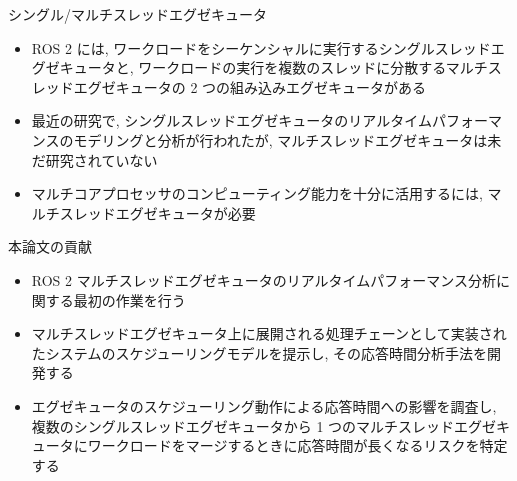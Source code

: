 \begin{frame}{シングル/マルチスレッドエグゼキュータ}
    \begin{itemize}
        \item ROS 2 には, ワークロードをシーケンシャルに実行するシングルスレッドエグゼキュータと, ワークロードの実行を複数のスレッドに分散するマルチスレッドエグゼキュータの 2 つの組み込みエグゼキュータがある
        \item 最近の研究で, シングルスレッドエグゼキュータのリアルタイムパフォーマンスのモデリングと分析が行われたが, マルチスレッドエグゼキュータは未だ研究されていない
        \item マルチコアプロセッサのコンピューティング能力を十分に活用するには, マルチスレッドエグゼキュータが必要
    \end{itemize}
\end{frame}

\begin{frame}{本論文の貢献}
    \begin{itemize}
        \item ROS 2 マルチスレッドエグゼキュータのリアルタイムパフォーマンス分析に関する最初の作業を行う
        \item マルチスレッドエグゼキュータ上に展開される処理チェーンとして実装されたシステムのスケジューリングモデルを提示し, その応答時間分析手法を開発する
        \item エグゼキュータのスケジューリング動作による応答時間への影響を調査し, 複数のシングルスレッドエグゼキュータから 1 つのマルチスレッドエグゼキュータにワークロードをマージするときに応答時間が長くなるリスクを特定する
    \end{itemize}
\end{frame}
